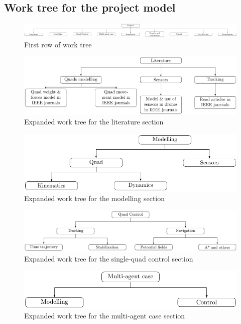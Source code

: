 \documentclass{article}
\begin{document}
	\subsection{Work tree for the project model}
		\begin{figure}[H]
			\centering
			\includegraphics[width=1.15\linewidth]{Workplan_work_tree/basic_work_tree_diagram}
			\caption{First row of work tree}
			\label{fig:work_tree_basic}
		\end{figure}
		\begin{figure}[H]
			\centering
			\includegraphics[width=.8\linewidth]{Workplan_work_tree/literature_work_tree_diagram}
			\caption{Expanded work tree for the literature section}
		\end{figure}
		\begin{figure}[H]
			\centering
			\includegraphics[width=.8\linewidth]{Workplan_work_tree/modelling_work_tree_diagram}
			\caption{Expanded work tree for the modelling section}
		\end{figure}
		\begin{figure}[H]
			\centering
			\includegraphics[width=.8\linewidth]{Workplan_work_tree/control_work_tree_diagram}
			\caption{Expanded work tree for the single-quad control section}
		\end{figure}
		\begin{figure}[H]
			\centering
			\includegraphics[width=.8\linewidth]{Workplan_work_tree/multiagent_work_tree_diagram}
			\caption{Expanded work tree for the multi-agent case section}
		\end{figure}
\end{document}
